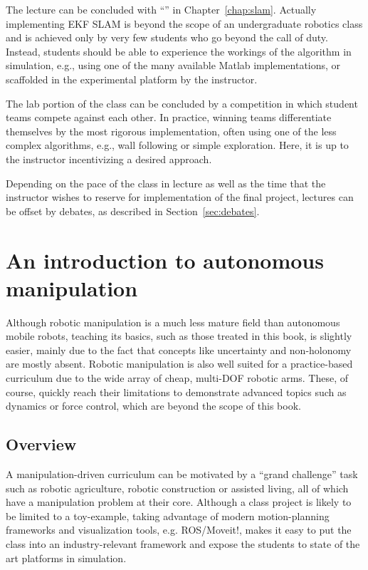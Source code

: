 \documentclass[paper=6.14in:9.21in,pagesize=pdftex,11pt,twoside,openright]{scrbook}
\begin{document}
The lecture can be concluded with ``'' in Chapter~\ref{chap:slam}. Actually implementing EKF SLAM is beyond the scope of an undergraduate robotics class and is achieved only by very few students who go beyond the call of duty. Instead, students should be able to experience the workings of the algorithm in simulation, e.g., using one of the many available Matlab implementations, or scaffolded in the experimental platform by the instructor.

The lab portion of the class can be concluded by a competition in which student teams compete against each other. In practice, winning teams differentiate themselves by the most rigorous implementation, often using one of the less complex algorithms, e.g., wall following or simple exploration. Here, it is up to the instructor incentivizing a desired approach.

Depending on the pace of the class in lecture as well as the time that the instructor wishes to reserve for implementation of the final project, lectures can be offset by debates, as described in Section~\ref{sec:debates}.

\section{An introduction to autonomous manipulation}
Although robotic manipulation is a much less mature field than autonomous mobile robots, teaching its basics, such as those treated in this book, is slightly easier, mainly due to the fact that concepts like uncertainty and non-holonomy are mostly absent. Robotic manipulation is also well suited for a practice-based curriculum due to the wide array of cheap, multi-DOF robotic arms. These, of course, quickly reach their limitations to demonstrate advanced topics such as dynamics or force control, which are beyond the scope of this book.

\subsection{Overview}
A manipulation-driven curriculum can be motivated by a ``grand challenge'' task such as robotic agriculture, robotic construction or assisted living, all of which have a manipulation problem at their core. Although a class project is likely to be limited to a toy-example, taking advantage of modern motion-planning frameworks and visualization tools, e.g. ROS/Moveit!, makes it easy to put the class into an industry-relevant framework and expose the students to state of the art platforms in simulation.
\end{document}
